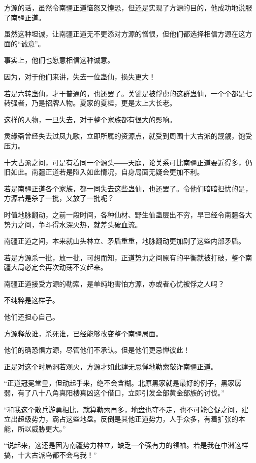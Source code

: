 
\begin{this_body}

方源的话，虽然令南疆正道恼怒又惶恐，但还是实现了方源的目的，他成功地说服了南疆正道。

虽然这种坦诚，让南疆正道无不更添对方源的憎恨，但他们都选择相信方源在这方面的“诚意”。

事实上，他们也愿意相信这种诚意。

因为，对于他们来讲，失去一位蛊仙，损失更大！

若是六转蛊仙，才干普通的，也还罢了。关键是被俘虏的这群蛊仙，一个个都是七转强者，乃是招牌人物。夏家的夏槎，更是太上大长老。

这样的人物，一旦失去，对于整个家族都有很大的影响。

灵缘斋曾经失去过凤九歌，立即所属的资源点，就受到周围十大古派的觊觎，饱受压力。

十大古派之间，可是有着同一个源头――天庭，论关系可比南疆正道要近得多，仍旧如此。南疆正道若是陷入如此情况，自身局面无疑会更加不利。

若是南疆正道各个家族，都一同失去这些蛊仙，也还罢了。令他们暗暗担忧的是，方源若是杀了一批，又放了一批呢？

时值地脉翻动，之前一段时间，各种仙材、野生仙蛊层出不穷，早已经令南疆各大势力之间，争斗得水深火热，就差头破血流。

南疆正道之间，本来就山头林立、矛盾重重，地脉翻动更加剧了这些内部矛盾。

若是方源杀一批，放一批，可想而知，正道势力之间原有的平衡就被打破，整个南疆大局必定会再次动荡不安起来。

南疆正道接受方源的勒索，是单纯地害怕方源，亦或者心忧被俘之人吗？

不纯粹是这样子。

他们还担心自己。

方源释放谁，杀死谁，已经能够改变整个南疆局面。

他们的确恐惧方源，尽管他们不承认。但是他们更忌惮彼此！

正是对这个时局洞若观火，方源才如此肆无忌惮地勒索敲诈南疆正道。

“正道冠冕堂皇，但动起手来，绝不会含糊。北原黑家就是最好的例子，黑家孱弱，有了八十八角真阳楼真凶这个借口，立即引发全部黄金部族的讨伐。”

“和我这个散兵游勇相比，就算勒索再多，地盘也夺不走，也不可能仓促之间，建立出超级势力，霸占这些地盘。反倒是其他正道势力，人手众多，有着扩张的本能，所以威胁更大。”

“说起来，这还是因为南疆势力林立，缺乏一个强有力的领袖。若是我在中洲这样搞，十大古派鸟都不会鸟我！”


\end{this_body}
